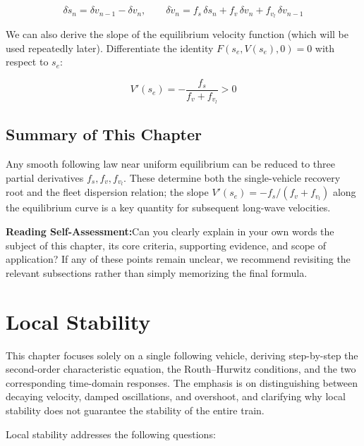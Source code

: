 \documentclass[11pt,a4paper,openany]{book}
\numberwithin{equation}{chapter}
\numberwithin{figure}{chapter}
\numberwithin{table}{chapter}
\newcommand{\sectionwrapup}[1]{%
  \section{Summary of This Chapter}
  \begin{tcolorbox}[summarybox,title=\textbf{Chapter Review}]
  #1
  \par\smallskip
  \textbf{Reading Self-Assessment:}Can you clearly explain in your own words the subject of this chapter, its core criteria, supporting evidence, and scope of application? If any of these points remain unclear, we recommend revisiting the relevant subsections rather than simply memorizing the final formula.
\end{tcolorbox}
  \clearpage
}
\newcommand{\chapterguide}[2]{%
  \begin{tcolorbox}[chapterguide,title=\textbf{Chapter Guide: #1}]
  #2
  \end{tcolorbox}}
\begin{document}
\begin{tcolorbox}[keybox]
\begin{equation}
\delta\dot s_n = \delta v_{n-1}-\delta v_n,
\qquad
\delta\dot v_n = f_s\,\delta s_n + f_v\,\delta v_n + f_{v_l}\,\delta v_{n-1}
\end{equation}
\end{tcolorbox}










We can also derive the slope of the equilibrium velocity function (which will be used repeatedly later). Differentiate the identity $F\!\left(s_e,V(s_e),0\right)=0$ with respect to $s_e$:

\begin{equation}
V'(s_e) = -\frac{f_s}{f_v+f_{v_l}} > 0
\label{eq:Vprime}
\end{equation}






\sectionwrapup{Any smooth following law near uniform equilibrium can be reduced to three partial derivatives $f_s,f_v,f_{v_l}$. These determine both the single-vehicle recovery root and the fleet dispersion relation; the slope $V'(s_e)=-f_s/(f_v+f_{v_l})$ along the equilibrium curve is a key quantity for subsequent long-wave velocities.
}

\chapter{Local Stability}
\label{sec:local}
\chapterguide{How a Following Vehicle Recovers After a Disturbance}{




This chapter focuses solely on a single following vehicle, deriving step-by-step the second-order characteristic equation, the Routh–Hurwitz conditions, and the two corresponding time-domain responses. The emphasis is on distinguishing between decaying velocity, damped oscillations, and overshoot, and clarifying why local stability does not guarantee the stability of the entire train.
}










Local stability addresses the following questions:
\end{document}
